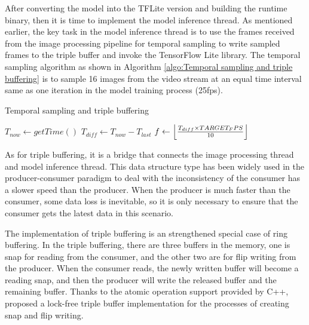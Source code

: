 After converting the model into the TFLite version and building the runtime binary, then it is time to implement the model inference thread.
As mentioned earlier, the key task in the model inference thread is to use the frames received from the image processing pipeline for temporal sampling to write sampled frames to the triple buffer and invoke the TensorFlow Lite library.
The temporal sampling algorithm as shown in Algorithm \ref{algo:Temporal sampling and triple buffering} is to sample 16 images from the video stream at an equal time interval same as one iteration in the model training process (25fps).

\begin{algorithm}[!ht]
\caption{Temporal sampling and triple buffering}
\label{algo:Temporal sampling and triple buffering}
$T_{now} \gets getTime()$
$T_{diff} \gets T_{now} - T_{last}$\;
$f \gets \floor*{\frac{T_{diff} \times TARGET_FPS}{10}}$
\end{algorithm}

As for triple buffering, it is a bridge that connects the image processing thread and model inference thread.
This data structure type has been widely used in the producer-consumer paradigm to deal with the inconsistency of the consumer has a slower speed than the producer.
When the producer is much faster than the consumer, some data loss is inevitable, so it is only necessary to ensure that the consumer gets the latest data in this scenario.

The implementation of triple buffering is an strengthened special case of ring buffering.
In the triple buffering, there are three buffers in the memory, one is snap for reading from the consumer, and the other two are for flip writing from the producer.
When the consumer reads, the newly written buffer will become a reading snap, and then the producer will write the released buffer and the remaining buffer.
Thanks to the atomic operation support provided by C++, \citet{andre2021triple} proposed a lock-free triple buffer implementation for the processes of creating snap and flip writing.

